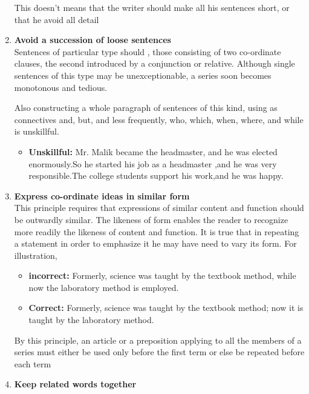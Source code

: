 \documentclass{report}
\begin{document}
\begin{enumerate}
	This doesn't means that the writer should make all his sentences short, or that he avoid all detail
	\item \textbf{Avoid a succession of loose sentences}\\
	Sentences of particular type should , those consisting  of
	two co-ordinate clauses, the second introduced by a conjunction or relative. Although
	single sentences of this type may be unexceptionable, a series soon
	becomes monotonous and tedious.
	
	Also constructing a whole paragraph of sentences of this kind, using as connectives and, but, and less frequently, who, which, when, where, and
	while is unskillful.
	
	\begin{itemize}
		\item \textbf{Unskillful: }Mr. Malik became the headmaster, and he was elected enormously.So he started his job as a headmaster ,and he was very responsible.The college students support his work,and he was happy.
	\end{itemize}
	
\item \textbf{Express co-ordinate ideas in similar form}\\
	
	This principle requires that expressions of similar content and function should
	be outwardly similar. The likeness of form enables the reader to recognize more
	readily the likeness of content and function.
	It is true that in repeating a statement in order to emphasize it he may have
	need to vary its form. For illustration,
	
	\begin{itemize}
		\item \textbf{incorrect: }Formerly, science was taught by the textbook method, while now the laboratory method is employed.
		\item \textbf{Correct:} Formerly, science was taught by the textbook method; now it is taught by the laboratory method.
	\end{itemize}
	By this principle, an article or a preposition applying to all the members of a
	series must either be used only before the first term or else be repeated before
	each term
	
	\item \textbf{Keep related words together}\\
	

\end{enumerate}
\end{document}
